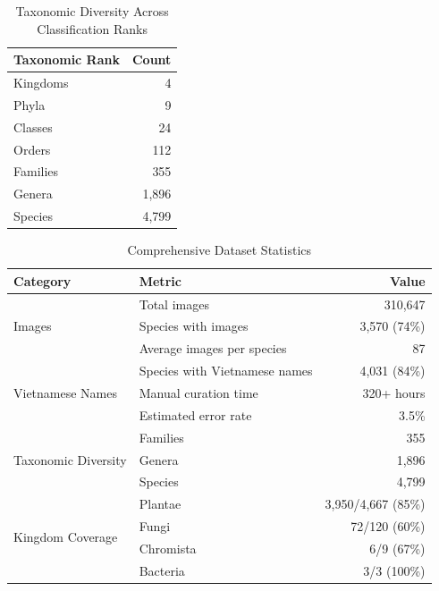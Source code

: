 
\begin{table}[t]
\centering
\caption{Taxonomic Diversity Across Classification Ranks}
\label{tab:taxonomic_diversity}
\begin{tabular}{lr}
\toprule
\textbf{Taxonomic Rank} & \textbf{Count} \\
\midrule
Kingdoms & 4 \\
Phyla & 9 \\
Classes & 24 \\
Orders & 112 \\
Families & 355 \\
Genera & 1,896 \\
Species & 4,799 \\
\bottomrule
\end{tabular}
\end{table}


\begin{table}[t]
\centering
\caption{Comprehensive Dataset Statistics}
\label{tab:comprehensive_stats}
\begin{tabular}{llr}
\toprule
\textbf{Category} & \textbf{Metric} & \textbf{Value} \\
\midrule
\multirow{3}{*}{Images} & Total images & 310,647 \\
 & Species with images & 3,570 (74\%) \\
 & Average images per species & 87 \\
\midrule
\multirow{3}{*}{Vietnamese Names} & Species with Vietnamese names & 4,031 (84\%) \\
 & Manual curation time & 320+ hours \\
 & Estimated error rate & 3.5\% \\
\midrule
\multirow{3}{*}{Taxonomic Diversity} & Families & 355 \\
 & Genera & 1,896 \\
 & Species & 4,799 \\
\midrule
\multirow{4}{*}{Kingdom Coverage} & Plantae & 3,950/4,667 (85\%) \\
 & Fungi & 72/120 (60\%) \\
 & Chromista & 6/9 (67\%) \\
 & Bacteria & 3/3 (100\%) \\
\bottomrule
\end{tabular}
\end{table}

